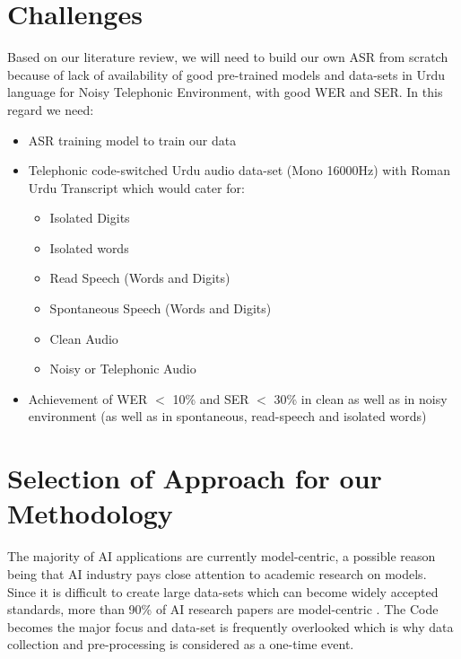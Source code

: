\section{Challenges} %
\label{sec:challenges}
Based on our literature review, we will need to build our own ASR from scratch because of lack of availability of good pre-trained models and data-sets in Urdu language for Noisy Telephonic Environment, with good WER and SER. In this regard we need:
\begin{itemize}
    \item ASR training model to train our data   
    \item Telephonic code-switched Urdu audio data-set (Mono 16000Hz) with Roman Urdu Transcript which would cater for:
    \begin{itemize}
        \item Isolated Digits
        \item Isolated words
        \item Read Speech (Words and Digits)
        \item Spontaneous Speech (Words and Digits)
        \item Clean Audio
        \item Noisy or Telephonic Audio
    \end{itemize}
    \item Achievement of WER $<$ 10\% and SER $<$ 30\% in clean as well as in noisy environment (as well as in spontaneous, read-speech and isolated words)
\end{itemize}


\section{Selection of Approach for our Methodology}
The majority of AI applications are currently model-centric, a possible reason being that AI industry pays close attention to academic research on models. Since it is difficult to create large data-sets which can become widely accepted standards, more than 90\% of AI research papers are model-centric \cite{deeplearningai_data-centric_2021}. The Code becomes the major focus and data-set is frequently overlooked which is why data collection and pre-processing is considered as a one-time event.


